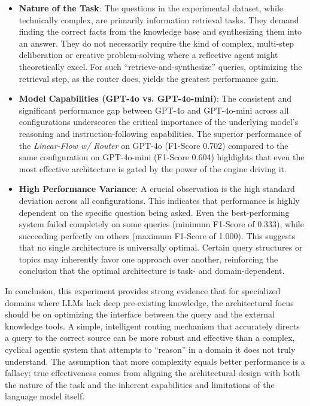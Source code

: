             \begin{itemize}
                \item \textbf{Nature of the Task}: The questions in the experimental dataset, while technically complex, are primarily information retrieval tasks. They demand finding the correct facts from the knowledge base and synthesizing them into an answer. They do not necessarily require the kind of complex, multi-step deliberation or creative problem-solving where a reflective agent might theoretically excel. For such ``retrieve-and-synthesize'' queries, optimizing the retrieval step, as the router does, yields the greatest performance gain.
                
                \item \textbf{Model Capabilities (GPT-4o vs. GPT-4o-mini)}: The consistent and significant performance gap between GPT-4o and GPT-4o-mini across all configurations underscores the critical importance of the underlying model's reasoning and instruction-following capabilities. The superior performance of the \textit{Linear-Flow w/ Router} on GPT-4o (F1-Score 0.702) compared to the same configuration on GPT-4o-mini (F1-Score 0.604) highlights that even the most effective architecture is gated by the power of the engine driving it.
                
                \item \textbf{High Performance Variance}: A crucial observation is the high standard deviation across all configurations. This indicates that performance is highly dependent on the specific question being asked. Even the best-performing system failed completely on some queries (minimum F1-Score of 0.333), while succeeding perfectly on others (maximum F1-Score of 1.000). This suggests that no single architecture is universally optimal. Certain query structures or topics may inherently favor one approach over another, reinforcing the conclusion that the optimal architecture is task- and domain-dependent.
            \end{itemize}
            
            In conclusion, this experiment provides strong evidence that for specialized domains where LLMs lack deep pre-existing knowledge, the architectural focus should be on optimizing the interface between the query and the external knowledge tools. A simple, intelligent routing mechanism that accurately directs a query to the correct source can be more robust and effective than a complex, cyclical agentic system that attempts to ``reason'' in a domain it does not truly understand. The assumption that more complexity equals better performance is a fallacy; true effectiveness comes from aligning the architectural design with both the nature of the task and the inherent capabilities and limitations of the language model itself.